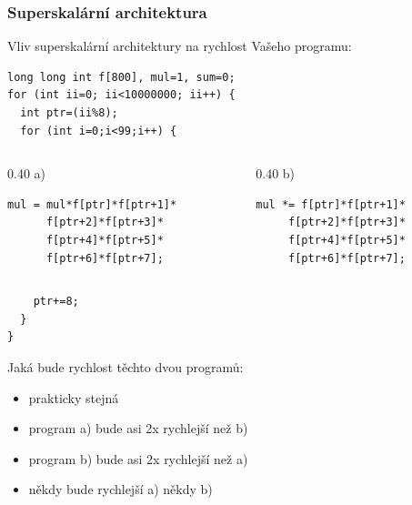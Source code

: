 \documentclass{beamer}
\begin{document}
\begin{frame}[fragile]
\frametitle{Superskalární architektura}

Vliv superskalární architektury na rychlost Vašeho programu:

\begin{verbatim}
long long int f[800], mul=1, sum=0;
for (int ii=0; ii<10000000; ii++) {
  int ptr=(ii%8);
  for (int i=0;i<99;i++) {
\end{verbatim}
\begin{columns}[T]
\begin{column}{0.40\textwidth}
\phantom{xxxxx}a)

\begin{verbatim}
mul = mul*f[ptr]*f[ptr+1]*
      f[ptr+2]*f[ptr+3]*
      f[ptr+4]*f[ptr+5]*
      f[ptr+6]*f[ptr+7];
\end{verbatim}
\end{column}
\begin{column}{0.40\textwidth}
\phantom{xxxxx}b)

\begin{verbatim}
mul *= f[ptr]*f[ptr+1]*
     f[ptr+2]*f[ptr+3]*
     f[ptr+4]*f[ptr+5]*
     f[ptr+6]*f[ptr+7];
\end{verbatim}
\end{column}
\end{columns}

\begin{verbatim}
    ptr+=8;
  }
}
\end{verbatim}

Jaká bude rychlost těchto dvou programů:
\begin{itemize}
 \item[A] prakticky stejná
 \item[B] program a) bude asi 2x rychlejší než b)
 \item[C] program b) bude asi 2x rychlejší než a)
 \item[D] někdy bude rychlejší a) někdy b)
\end{itemize}

\end{frame}
\end{document}
